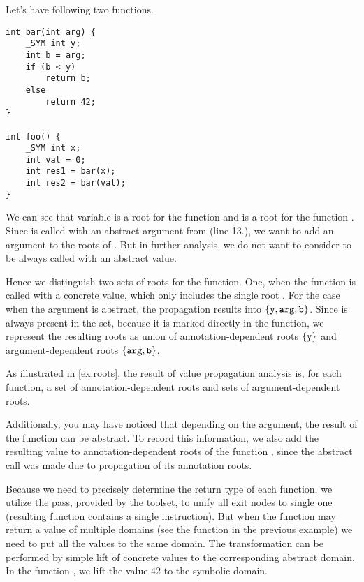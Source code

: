 \begin{example} \label{ex:roots} Let's have following two functions.
    \begin{verbatim}
int bar(int arg) {
    _SYM int y;
    int b = arg;
    if (b < y)
        return b;
    else
        return 42;
}

int foo() {
    _SYM int x;
    int val = 0;
    int res1 = bar(x);
    int res2 = bar(val);
}
\end{verbatim}
    We can see that variable  is a root for the function  and
     is a root for the function . Since  is called
    with an abstract argument from  (line 13.), we want to add an
    argument  to the roots of . But in further analysis, we
    do not want to consider  to be always called with an abstract
    value.

    Hence we distinguish two sets of roots for the  function. One,
    when the function is called with a concrete value, which only includes the
    single root . For the case when the argument is abstract, the
    propagation results into $\{\texttt{y}, \texttt{arg}, \texttt{b}\}$. Since
     is always present in the set, because it is marked directly in the
    function, we represent the resulting roots as union of annotation-dependent
    roots $\{\texttt{y}\}$ and argument-dependent roots $\{\texttt{arg},
    \texttt{b}\}$.
\end{example}

As illustrated in \autoref{ex:roots}, the result of value propagation analysis
is, for each function, a set of annotation-dependent roots and sets of
argument-dependent roots.

Additionally, you may have noticed that depending on the
argument, the result of the function  can be abstract. To record this
information, we also add the resulting value  to anno\-tation-dependent
roots of the function , since the abstract call was made due to
propagation of its annotation roots.

Because we need to precisely determine the return type of each function, we
utilize the  pass, provided by the \LLVM toolset,
to unify all exit nodes to single one (resulting function contains a single
 instruction). But when the function may return a value of multiple
domains (see the function  in the previous example) we need to put all
the values to the same domain. The transformation can be performed by simple
lift of concrete values to the corresponding abstract domain. In the function
, we lift the value 42 to the symbolic domain.

